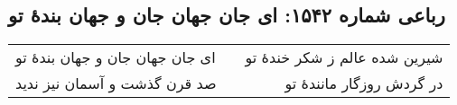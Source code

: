 \begin{center}
\section*{رباعی شماره ۱۵۴۲: ای جان جهان جان و جهان بندهٔ تو}
\label{sec:1542}
\begin{longtable}{l p{0.5cm} r}
ای جان جهان جان و جهان بندهٔ تو
&&
شیرین شده عالم ز شکر خندهٔ تو
\\
صد قرن گذشت و آسمان نیز ندید
&&
در گردش روزگار مانندهٔ تو
\\
\end{longtable}
\end{center}
